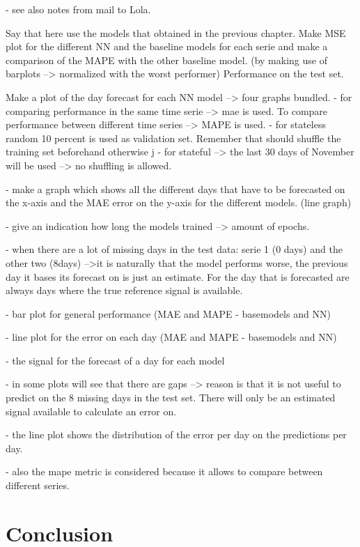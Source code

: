 - see also notes from mail to Lola. 

Say that here use the models that obtained in the previous chapter. Make MSE plot for the different NN and the baseline models for each serie and make a comparison of the MAPE with the other baseline model. (by making use of barplots --> normalized with the worst performer) Performance on the test set. 

Make a plot of the day forecast for each NN model --> four graphs bundled. 
- for comparing performance in the same time serie --> mae is used. To compare performance between different time series --> MAPE is used. 
- for stateless random 10 percent is used as validation set. Remember that should shuffle the training set beforehand otherwise j
- for stateful --> the last 30 days of November will be used --> no shuffling is allowed.

- make a graph which shows all the different days that have to be forecasted on the x-axis and the MAE error on the y-axis for the different models. (line graph)

- give an indication how long the models trained --> amount of epochs. 

- when there are a lot of missing days in the test data: serie 1 (0 days) and the other two (8days) -->it is naturally that the model performs worse, the previous day it bases its forecast on is just an estimate. For the day that is forecasted are always days where the true reference signal is available. 



- bar plot for general performance (MAE and MAPE - basemodels and NN)

- line plot for the error on each day (MAE and MAPE - basemodels and NN)

- the signal for the forecast of a day for each model

- in some plots will see that there are gaps --> reason is that it is not useful to predict on the $ 8 $ missing days in the test set. There will only be an estimated signal available to calculate an error on. 

- the line plot shows the distribution of the error per day on the predictions per day. 

- also the mape metric is considered because it allows to compare between different series. 


\section{Conclusion}


